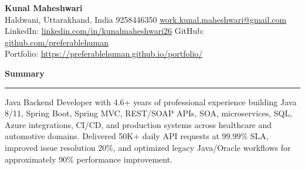 \documentclass[10pt,letterpaper]{article}
\newcommand{\ressection}[1]{\vspace{2.6pt}\par\textbf{#1}\par\vspace{0.8pt}\hrule\vspace{1.6pt}}
\begin{document}
\pagestyle{empty}\raggedright\fontsize{9.92}{10.68}\selectfont

{\Large \textbf{Kunal Maheshwari}}\\
Haldwani, Uttarakhand, India \textbar{} 9258446350 \textbar{} \href{mailto:work.kunal.maheshwari@gmail.com} {work.kunal.maheshwari@gmail.com} \\
LinkedIn: \href{https://www.linkedin.com/in/kunalmaheshwari26}{linkedin.com/in/kunalmaheshwari26} \textbar{} GitHub: \href{https://github.com/preferablehuman}{github.com/preferablehuman}\\
Portfolio: \href{https://preferablehuman.github.io/portfolio/}{https://preferablehuman.github.io/portfolio/}
\ressection{Summary}
Java Backend Developer with 4.6+ years of professional experience building Java 8/11, Spring Boot, Spring MVC, REST/SOAP APIs, SOA, microservices, SQL, Azure integrations, CI/CD, and production systems across healthcare and automotive domains. Delivered 50K+ daily API requests at 99.99\% SLA, improved issue resolution 20\%, and optimized legacy Java/Oracle workflows for approximately 90\% performance improvement.
\end{document}
